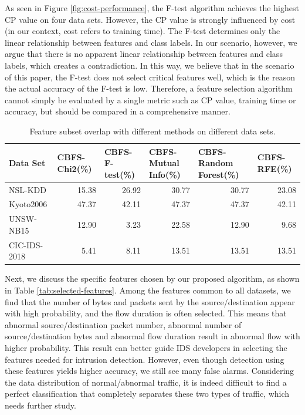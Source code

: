 \documentclass{ieeeaccess}
\theoremstyle{definition}
\begin{document}
As seen in Figure \ref{fig:cost-performance}, the F-test algorithm achieves the highest CP value on four data sets. However, the CP value is strongly influenced by cost (in our context, cost refers to training time). The F-test determines only the linear relationship between features and class labels. In our scenario, however, we argue that there is no apparent linear relationship between features and class labels, which creates a contradiction. In this way, we believe that in the scenario of this paper, the F-test does not select critical features well, which is the reason the actual accuracy of the F-test is low. Therefore, a feature selection algorithm cannot simply be evaluated by a single metric such as CP value, training time or accuracy, but should be compared in a comprehensive manner.

\begin{table}[htbp]
    \centering
    \caption{Feature subset overlap with different methods on different data sets.}
    \begin{tabular}{lrrrrr}
    \toprule
    Data Set & \multicolumn{1}{l}{CBFS-Chi2(\%)} & \multicolumn{1}{l}{CBFS-F-test(\%)} & \multicolumn{1}{l}{CBFS-Mutual Info(\%)} & \multicolumn{1}{l}{CBFS-Random Forest(\%)} & \multicolumn{1}{l}{CBFS-RFE(\%)} \\
    \midrule
    NSL-KDD & 15.38  & 26.92  & 30.77  & 30.77  & 23.08  \\
    Kyoto2006 & 47.37  & 42.11  & 47.37  & 47.37  & 42.11  \\
    UNSW-NB15 & 12.90  & 3.23  & 22.58  & 12.90  & 9.68  \\
    CIC-IDS-2018 & 5.41  & 8.11  & 13.51  & 13.51  & 13.51  \\
    \bottomrule
    \end{tabular}%
    \label{tab:feature-overlap}%
\end{table}%


Next, we discuss the specific features chosen by our proposed algorithm, as shown in Table \ref{tab:selected-features}. Among the features common to all datasets, we find that the number of bytes and packets sent by the source/destination appear with high probability, and the flow duration is often selected. This means that abnormal source/destination packet number, abnormal number of source/destination bytes and abnormal flow duration result in abnormal flow with higher probability. This result can better guide IDS developers in selecting the features needed for intrusion detection. However, even though detection using these features yields higher accuracy, we still see many false alarms. Considering the data distribution of normal/abnormal traffic, it is indeed difficult to find a perfect classification that completely separates these two types of traffic, which needs further study.
\end{document}
